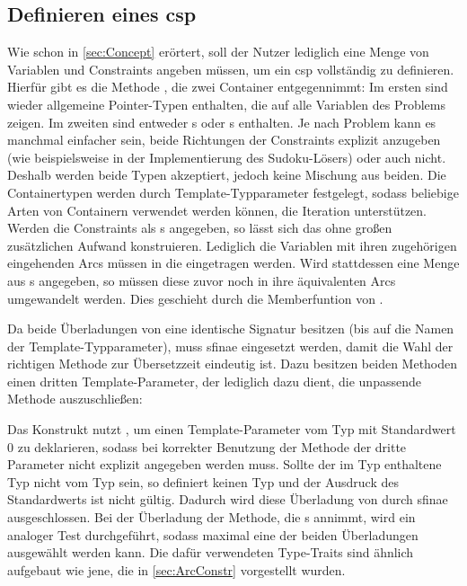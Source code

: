 \subsection{Definieren eines \ac*{csp}}
Wie schon in \cref{sec:Concept} erörtert, soll der Nutzer lediglich eine Menge von Variablen und Constraints angeben müssen, um ein \ac*{csp} vollständig zu definieren. Hierfür
gibt es die Methode , die zwei Container entgegennimmt: Im ersten sind wieder allgemeine Pointer-Typen enthalten, die auf alle Variablen des Problems zeigen.
Im zweiten sind entweder s oder s enthalten. Je nach Problem kann es manchmal einfacher sein, beide Richtungen der Constraints explizit
anzugeben (wie beispielsweise in der Implementierung des Sudoku-Lösers) oder auch nicht. Deshalb werden beide Typen akzeptiert, jedoch keine Mischung aus beiden. Die Containertypen
werden durch Template-Typparameter festgelegt, sodass beliebige Arten von Containern verwendet werden können, die Iteration unterstützen. Werden die Constraints als
s angegeben, so lässt sich das  ohne großen zusätzlichen Aufwand konstruieren. Lediglich die Variablen mit ihren zugehörigen eingehenden Arcs
müssen in die  eingetragen werden. Wird stattdessen eine Menge aus s angegeben, so müssen diese zuvor noch in ihre äquivalenten
Arcs umgewandelt werden. Dies geschieht durch die Memberfuntion  von .

Da beide Überladungen von  eine identische Signatur besitzen (bis auf die Namen der Template-Typparameter), muss \ac*{sfinae} eingesetzt werden, damit
die Wahl der richtigen Methode zur Übersetzzeit eindeutig ist. Dazu besitzen beiden Methoden einen dritten Template-Parameter, der lediglich dazu dient, die unpassende Methode
auszuschließen:

Das Konstrukt nutzt , um einen Template-Parameter vom Typ  mit Standardwert 0 zu deklarieren, sodass bei korrekter Benutzung der Methode
der dritte Parameter nicht explizit angegeben werden muss. Sollte der im Typ  enthaltene Typ nicht vom Typ  sein, so definiert
 keinen Typ und der Ausdruck des Standardwerts ist nicht gültig. Dadurch wird diese Überladung von  durch \ac*{sfinae}
ausgeschlossen. Bei der Überladung der Methode, die s annimmt, wird ein analoger Test durchgeführt, sodass maximal eine der beiden Überladungen ausgewählt
werden kann. Die dafür verwendeten Type-Traits sind ähnlich aufgebaut wie jene, die in \cref{sec:ArcConstr} vorgestellt wurden.

